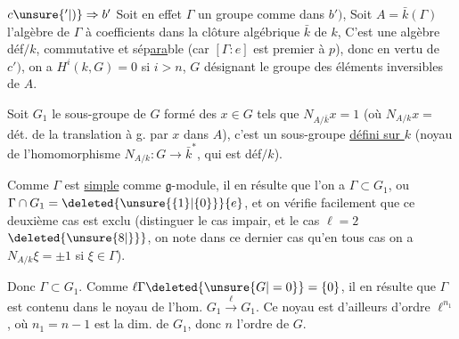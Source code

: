 
$c\unsure{'|)}\Rightarrow b'$ Soit en effet $\Gamma$ un groupe comme dans $b')$,  Soit $A=\bar k(\Gamma)$ l'algèbre de $\Gamma$ à coefficients dans la clôture algébrique $\bar k$ de $k$,  C'est une algèbre déf$/k$, commutative et  sép\uline{ara}ble (car $[\Gamma:e]$ est premier à $p$), donc en vertu de $c')$, on a $H^i(k,G)=0$ si $i>n$, $G$ désignant le groupe des éléments inversibles de $A$.

Soit $G_1$ le sous-groupe de $G$ formé des $x\in G$ tels que $N_{A/\bar k}x=1$ (où  $N_{A/k}x=$ dét. de la translation à g. par $x$ dans $A$), c'est un sous-groupe \uline{défini sur $k$} (noyau de l'homomorphisme $N_{A/k}:G\longrightarrow\bar k^*$, qui est déf$/k$).

Comme $\Gamma$ est \uline{simple} comme $\mathfrak g$-module,  il en résulte que  l'on a $\Gamma\subset G_1$, ou $\Gamma\cap G_1=\deleted{\unsure{\{1\}|\{0\}}}\{e\}$, et on vérifie facilement que ce deuxième cas est exclu (distinguer le cas \inserted{$\ell$} impair, et le cas $\ell=2$ $\deleted{\unsure{8|\}}}$, on note  dans ce dernier cas qu'en tous cas on a $N_{A/k}\xi=\pm1$ si $\xi\in\Gamma$).

Donc $\Gamma\subset G_1$. Comme $\ell\Gamma\deleted{\unsure{G|=0}}=\{0\}$, il en résulte que $\Gamma$ est contenu dans le noyau de l'hom. $G_1\xrightarrow{\ell}G_1$. Ce noyau est d'ailleurs d'ordre $\ell^{n_1}$, où $n_1=n-1$ est la dim. de $G_1$, donc $n$ l'ordre de $G$.


